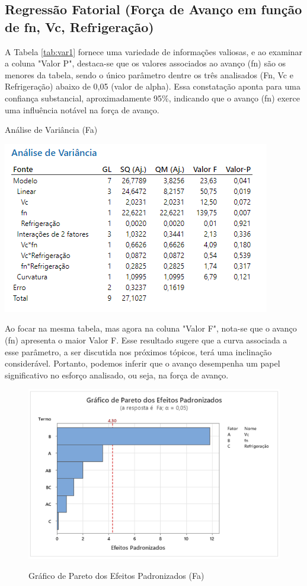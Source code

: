 \documentclass[deposito, acronym, symbols]{fei}
\begin{document}
 \subsection{Regressão Fatorial (Força de Avanço em função de fn, Vc, Refrigeração)} \label{regressaof}

A Tabela \ref{tab:var1} fornece uma variedade de informações valiosas, e ao examinar a coluna "Valor P", destaca-se que os valores associados ao avanço (fn) são os menores da tabela, sendo o único parâmetro dentre os três analisados (Fn, Vc e Refrigeração) abaixo de 0,05 (valor de alpha). Essa constatação aponta para uma confiança substancial, aproximadamente 95\%, indicando que o avanço (fn) exerce uma influência notável na força de avanço.

\begin{table}[!htb]
 \centering
    \caption{Análise de Variância (Fa)}
    \includegraphics[width=0.8\linewidth]{Imagens/variancia 1.png}
    \label{tab:var1}
 \end{table}

Ao focar na mesma tabela, mas agora na coluna "Valor F", nota-se que o avanço (fn) apresenta o maior Valor F. Esse resultado sugere que a curva associada a esse parâmetro, a ser discutida nos próximos tópicos, terá uma inclinação considerável. Portanto, podemos inferir que o avanço desempenha um papel significativo no esforço analisado, ou seja, na força de avanço.

\begin{figure}[!htp]
    \centering
    \caption{Gráfico de Pareto dos Efeitos Padronizados (Fa)}
    \includegraphics[width=0.8\linewidth]{Imagens/pareto 1.png}
    \label{fig:par1}
\end{figure}
\end{document}
